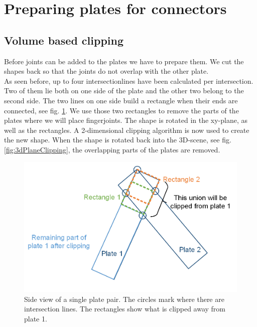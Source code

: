 \documentclass[../ClassicThesis.tex]{subfiles}
\begin{document}
\section{Preparing plates for connectors}
\subsection{Volume based clipping}
Before joints can be added to the plates we have to prepare them. We cut the shapes back so that the joints do not overlap with the other plate.\\
As seen before, up to four intersectionlines have been calculated per intersection. Two of them lie both on one side of the plate and the other two belong to the second side. The two lines on one side build a rectangle when their ends are connected, see fig. \ref{fig:clippingPlate}. We use those two rectangles to remove the parts of the plates where we will place fingerjoints. The shape is rotated in the xy-plane, as well as the rectangles. A 2-dimensional clipping algorithm is now used to create the new shape. When the shape is rotated back into the 3D-scene, see fig. \ref{fig:3dPlaneClipping}, the overlapping parts of the plates are removed.
\begin{figure}[!ht]
\centering
\includegraphics[width=\columnwidth]{Images/10-joints-clippingPlate.png}
\caption{Side view of a single plate pair. The circles mark where there are intersection lines. The rectangles show what is clipped away from plate 1. }
\label{fig:clippingPlate}
\end{figure}
\end{document}
